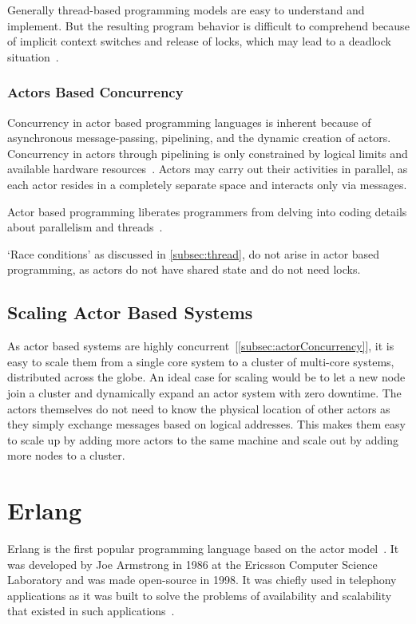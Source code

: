   Generally thread-based programming models are easy to understand and implement. But the resulting program behavior is difficult to comprehend because of implicit context switches and release of locks, which may lead to a deadlock situation~\cite{ambientTalk}.

\subsubsection{Actors Based Concurrency}
\label{subsec:actorConcurrency}
  Concurrency in actor based programming languages is inherent because of asynchronous message-passing, pipelining, and the dynamic creation of actors. Concurrency in actors through pipelining is only constrained by logical limits and available hardware resources~\cite{agha}. Actors may carry out their activities in parallel, as each actor resides in a completely separate space and interacts only via messages.

  Actor based programming liberates programmers from delving into coding details about parallelism and threads~\cite{agha}.

  ‘Race conditions’ as discussed in \autoref{subsec:thread}, do not arise in actor based programming, as actors do not have shared state and do not need locks.

\subsection{Scaling Actor Based Systems}
  As actor based systems are highly concurrent~[\autoref{subsec:actorConcurrency}], it is easy to scale them from a single core system to a cluster of multi-core systems, distributed across the globe. An ideal case for scaling would be to let a new node join a cluster and dynamically expand an actor system with zero downtime. The actors themselves do not need to know the physical location of other actors as they simply exchange messages based on logical addresses. This makes them easy to scale up by adding more actors to the same machine and scale out by adding more nodes to a cluster.

\section{Erlang}
\label{sec:erlang}
  Erlang is the first popular programming language based on the actor model~\cite{vinoski}. It was developed by Joe Armstrong in 1986 at the Ericsson Computer Science Laboratory and was made open-source in 1998. It was chiefly used in telephony applications as it was built to solve the problems of availability and scalability that existed in such applications~\cite{armstrong}.

